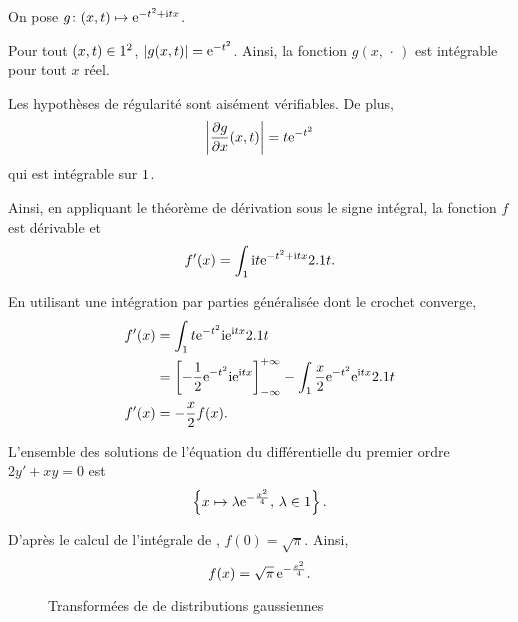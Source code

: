 \begin{solution} On pose $\fonctionligne[g]{(x, t)}{\e^{-t^2 + \i t x}}$.
\begin{reponses}
\item Pour tout $(x, t) \in \R^2$,  $\module{g(x, t)} = \e^{-t^2}$. Ainsi, la fonction $g(x, \,\cdot\,)$ est intégrable pour tout $x$ réel.

\item Les hypothèses de régularité sont aisément vérifiables. De plus,
\[
\module{\frac{\partial g}{\partial x}(x, t)} = t \e^{-t^2}
\]
qui est intégrable sur $\R$.

Ainsi, en appliquant le théorème de dérivation sous le signe intégral, la fonction $f$ est dérivable et
\[
f'(x) = \int_\R \i t \e^{-t^2 + \i t x} \d t.
\]

\item En utilisant une intégration par parties généralisée dont le crochet converge,
\begin{align*}
f'(x) &= \int_\R t \e^{-t^2} \i \e^{\i t x} \d t \\
&= \left[-\frac{1}{2} \e^{-t^2} \i \e^{\i t x}\right]_{-\infty}^{+\infty} - \int_\R \frac{x}{2} \e^{-t^2} \e^{\i t x} \d t \\
f'(x) &= -\frac{x}{2} f(x).
\end{align*}

\item L'ensemble des solutions de l'équation du différentielle du premier ordre $2 y' + x y = 0$ est
\[
\left\{x \mapsto \lambda \e^{-\frac{x^2}{4}},\, \lambda \in \R\right\}.
\]

D'après le calcul de l'intégrale de , $f(0) = \sqrt{\pi}$. Ainsi,
\[
f(x) = \sqrt{\pi}\, \e^{-\frac{x^2}{4}}.
\]
\end{reponses}
\end{solution}

\begin{figure}
    \centering
    
    \caption{Transformées de  de distributions gaussiennes }
\end{figure}



